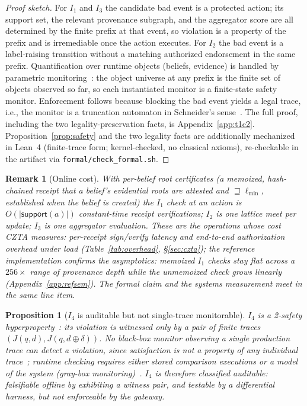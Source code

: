 \documentclass[conference]{IEEEtran}
\newtheorem{proposition}{Proposition}
\newtheorem{remark}{Remark}
\newcommand{\Ione}{\ensuremath{I_1}}
\newcommand{\Itwo}{\ensuremath{I_2}}
\newcommand{\Ithree}{\ensuremath{I_3}}
\newcommand{\Ifour}{\ensuremath{I_4}}
\newcommand{\support}{\ensuremath{\mathsf{support}}}
\newcommand{\lmin}{\ensuremath{\ell_{\min}}}
\begin{document}
\begin{proof}[Proof sketch]
For \Ione{} and \Ithree{} the candidate bad event is a protected
action; its support set, the relevant provenance subgraph, and the
aggregator score are all determined by the finite prefix at that
event, so violation is a property of the prefix and is
irremediable once the action executes. For \Itwo{} the bad event
is a label-raising transition without a matching authorized
endorsement in the same prefix. Quantification over runtime
objects (beliefs, evidence) is handled by parametric
monitoring~\cite{mop}: the object universe at any prefix is the
finite set of objects observed so far, so each instantiated
monitor is a finite-state safety monitor. Enforcement follows
because blocking the bad event yields a legal trace, i.e., the
monitor is a truncation automaton in Schneider's
sense~\cite{schneider}. The full proof, including the two
legality-preservation facts, is Appendix~\ref{app:t1c2}.
Proposition~\ref{prop:safety} and the two legality facts are
additionally mechanized in Lean~4 (finite-trace form;
kernel-checked, no classical axioms), re-checkable in the artifact
via \texttt{formal/check\_formal.sh}.
\end{proof}

\begin{remark}[Online cost]
With per-belief \emph{root certificates} (a memoized,
hash-chained receipt that a belief's evidential roots are attested
and $\sqsupseteq \lmin$, established when the belief is
created) the \Ione{} check at an action is $O(|\support(a)|)$
constant-time receipt verifications; \Itwo{} is one lattice meet
per update; \Ithree{} is one aggregator evaluation. These are
the operations whose cost CZTA measures: per-receipt sign/verify
latency and end-to-end authorization overhead under load
(Table~\ref{tab:overhead}, \S\ref{sec:czta}); the reference
implementation confirms the asymptotics: memoized
\Ione{} checks stay flat across a $256\times$ range of provenance
depth while the unmemoized check grows linearly
(Appendix~\ref{app:refsem}). The formal claim and the systems
measurement meet in the same line item.
\end{remark}

\begin{proposition}[\Ifour{} is auditable but not single-trace monitorable]
\label{prop:hyper}
\Ifour{} is a 2-safety hyperproperty~\cite{hyperprops}: its
violation is witnessed only by a pair of finite traces
$(J(q, d), J(q, d \oplus \delta))$. No black-box monitor observing
a single production trace can detect a violation, since
satisfaction is not a property of any individual
trace~\cite{hyperprops}; runtime checking requires either stored
comparison executions or a model of the system (gray-box
monitoring)~\cite{finkbeiner,stucki}. \Ifour{} is therefore
classified \emph{auditable}: falsifiable offline by exhibiting a
witness pair, and testable by a differential harness, but not
enforceable by the gateway.
\end{proposition}
\end{document}
